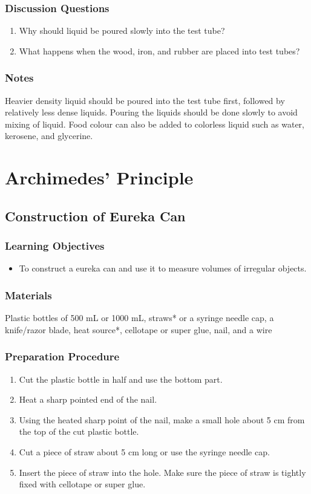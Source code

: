 \subsubsection*{Discussion Questions}
\begin{enumerate}
\item{Why should liquid be poured slowly into the test tube?}
\item{What happens when the wood, iron, and rubber are placed into test tubes?} 
\end{enumerate}

\subsubsection*{Notes}
Heavier density liquid should be poured into the test tube first, followed by relatively less dense liquids. Pouring the liquids should be done slowly to avoid mixing of liquid. Food colour can also be added to colorless liquid such as water, kerosene, and glycerine.  

\section{Archimedes' Principle}

\subsection{Construction of Eureka Can}

\subsubsection*{Learning Objectives}
\begin{itemize}
\item{To construct a eureka can and use it to measure volumes of irregular objects.} 
\end{itemize}

\subsubsection*{Materials}
Plastic bottles of 500 mL or 1000 mL, straws* or a syringe needle cap, a knife/razor blade, heat source*, cellotape or super glue, nail, and a wire

\subsubsection*{Preparation Procedure}
\begin{enumerate}
\item{Cut the plastic bottle in half and use the bottom part.} 
\item{Heat a sharp pointed end of the nail.} 
\item{Using the heated sharp point of the nail, make a small hole about 5 cm from the top of the cut plastic bottle.} 
\item{Cut a piece of straw about 5 cm long or use the syringe needle cap.} 
\item{Insert the piece of straw into the hole. Make sure the piece of straw is tightly fixed with cellotape or super glue.} 
\end{enumerate}


